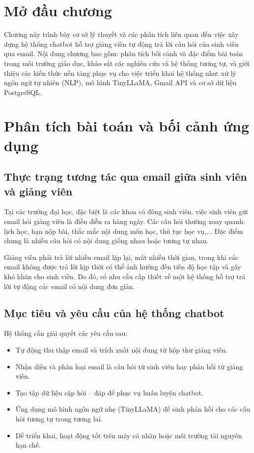 \documentclass[../DoAn.tex]{subfiles}
\begin{document}
\section{Mở đầu chương}
Chương này trình bày cơ sở lý thuyết và các phân tích liên quan đến việc xây dựng hệ thống chatbot hỗ trợ giảng viên tự động trả lời câu hỏi của sinh viên qua email. Nội dung chương bao gồm: phân tích bối cảnh và đặc điểm bài toán trong môi trường giáo dục, khảo sát các nghiên cứu và hệ thống tương tự, và giới thiệu các kiến thức nền tảng phục vụ cho việc triển khai hệ thống như: xử lý ngôn ngữ tự nhiên (NLP), mô hình TinyLLaMA, Gmail API và cơ sở dữ liệu PostgreSQL.

\section{Phân tích bài toán và bối cảnh ứng dụng}

\subsection{Thực trạng tương tác qua email giữa sinh viên và giảng viên}
Tại các trường đại học, đặc biệt là các khoa có đông sinh viên, việc sinh viên gửi email hỏi giảng viên là điều diễn ra hàng ngày. Các câu hỏi thường xoay quanh: lịch học, hạn nộp bài, thắc mắc nội dung môn học, thủ tục học vụ,... Đặc điểm chung là nhiều câu hỏi có nội dung giống nhau hoặc tương tự nhau.

Giảng viên phải trả lời nhiều email lặp lại, mất nhiều thời gian, trong khi các email không được trả lời kịp thời có thể ảnh hưởng đến tiến độ học tập và gây khó khăn cho sinh viên. Do đó, có nhu cầu cấp thiết về một hệ thống hỗ trợ trả lời tự động các email có nội dung đơn giản.

\subsection{Mục tiêu và yêu cầu của hệ thống chatbot}
Hệ thống cần giải quyết các yêu cầu sau:
\begin{itemize}
    \item Tự động thu thập email và trích xuất nội dung từ hộp thư giảng viên.
    \item Nhận diện và phân loại email là câu hỏi từ sinh viên hay phản hồi từ giảng viên.
    \item Tạo tập dữ liệu cặp hỏi – đáp để phục vụ huấn luyện chatbot.
    \item Ứng dụng mô hình ngôn ngữ nhẹ (TinyLLaMA) để sinh phản hồi cho các câu hỏi tương tự trong tương lai.
    \item Dễ triển khai, hoạt động tốt trên máy cá nhân hoặc môi trường tài nguyên hạn chế.
\end{itemize}
\end{document}
